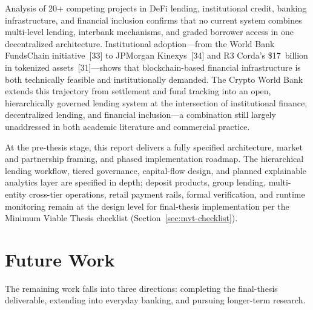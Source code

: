 \documentclass[12pt, a4paper]{report}
\begin{document}
Analysis of 20+ competing projects in DeFi lending, institutional credit, banking infrastructure, and financial inclusion confirms that no current system combines multi-level lending, interbank mechanisms, and graded borrower access in one decentralized architecture. Institutional adoption---from the World Bank FundsChain initiative~[33] to JPMorgan Kinexys~[34] and R3 Corda's \$17~billion in tokenized assets~[31]---shows that blockchain-based financial infrastructure is both technically feasible and institutionally demanded. The Crypto World Bank extends this trajectory from settlement and fund tracking into an open, hierarchically governed lending system at the intersection of institutional finance, decentralized lending, and financial inclusion---a combination still largely unaddressed in both academic literature and commercial practice.

At the pre-thesis stage, this report delivers a fully specified architecture, market and partnership framing, and phased implementation roadmap. The hierarchical lending workflow, tiered governance, capital-flow design, and planned explainable analytics layer are specified in depth; deposit products, group lending, multi-entity cross-tier operations, retail payment rails, formal verification, and runtime monitoring remain at the design level for final-thesis implementation per the Minimum Viable Thesis checklist (Section~\ref{sec:mvt-checklist}).

\section{Future Work}
\label{sec:future-work}

The remaining work falls into three directions: completing the final-thesis deliverable, extending into everyday banking, and pursuing longer-term research.
\end{document}

